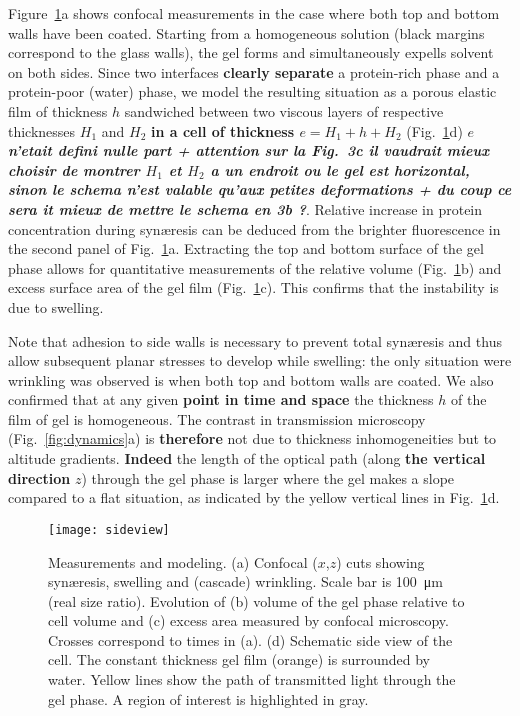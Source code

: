 \documentclass[twocolumn,superscriptaddress,showpacs,preprintnumbers,
amsmath,amssymb,prl]{revtex4-1}
\newcommand{\seb}[1]{\textbf{\color{blue}#1}} %
\begin{document}
Figure~\ref{fig:sideview}a shows confocal measurements in the case where both top and bottom walls have been coated. Starting from a homogeneous solution (black margins correspond to the glass walls), the gel forms and simultaneously expells solvent on both sides. Since two interfaces \seb{clearly separate} a protein-rich phase and a protein-poor (water) phase, we model the resulting situation as a porous elastic film of thickness $h$ sandwiched between two viscous layers of respective thicknesses $H_1$ and $H_2$ \seb{in a cell of thickness $e=H_1+h+H_2$} (Fig.~\ref{fig:sideview}d) \seb{\it $e$ n'etait defini nulle part + attention sur la Fig.~3c il vaudrait mieux choisir de montrer $H_1$ et $H_2$ a un endroit ou le gel est horizontal, sinon le schema n'est valable qu'aux petites deformations + du coup ce sera it mieux de mettre le schema en 3b ?}. Relative increase in protein concentration during syn\ae{}resis can be deduced from the brighter fluorescence in the second panel of Fig.~\ref{fig:sideview}a. Extracting the top and bottom surface of the gel phase allows for quantitative measurements of the relative volume (Fig.~\ref{fig:sideview}b) and excess surface area of the gel film (Fig.~\ref{fig:sideview}c). This confirms that the instability is due to swelling.

Note that adhesion to side walls is necessary to prevent total syn\ae{}resis and thus allow subsequent planar stresses to develop while swelling: the only situation were wrinkling was observed is when both top and bottom walls are coated. We also confirmed that at any given \seb{point in time and space} the thickness $h$ of the film of gel is homogeneous. The contrast in transmission microscopy (Fig.~\ref{fig:dynamics}a) is \seb{therefore} not due to thickness inhomogeneities but to altitude gradients. \seb{Indeed} the length of the optical path (along \seb{the vertical direction} $z$) through the gel phase is larger where the gel makes a slope compared to a flat situation, as indicated by the yellow vertical lines in Fig.~\ref{fig:sideview}d.

\begin{figure}
	\texttt{[image: sideview]}
	\caption{Measurements and modeling. (a) Confocal ($x$,$z$) cuts showing syn\ae{}resis, swelling and (cascade) wrinkling. Scale bar is \SI{100}{\micro\metre} (real size ratio). Evolution of (b) volume of the gel phase relative to cell volume and (c) excess area measured by confocal microscopy. Crosses correspond to times in (a). (d) Schematic side view of the cell. The constant thickness gel film (orange) is surrounded by water. Yellow lines show the path of transmitted light through the gel phase. A region of interest is highlighted in gray.}
	\label{fig:sideview}
\end{figure}
\end{document}
